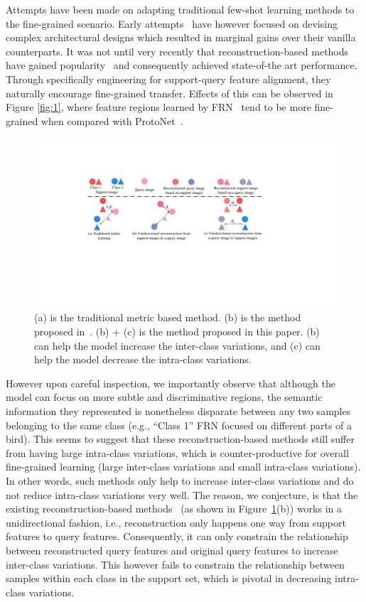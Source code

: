 \documentclass[letterpaper]{article} %
\begin{document}
Attempts have been made on adapting traditional few-shot learning methods to the fine-grained scenario. Early attempts~\cite{Huang2021LowRankPA, sun2020few, zhu2020multi} have however focused on devising complex architectural designs which resulted in marginal gains over their vanilla counterparts. It was not until very recently that reconstruction-based methods have gained popularity~\cite{Wertheimer_2021_CVPR, NEURIPS2020_fa28c6cd} and consequently achieved state-of-the art performance. Through specifically engineering for {support-query} feature alignment, they naturally encourage fine-grained transfer. Effects of this can be observed in Figure \ref{fig:1}, where feature regions learned by FRN~\cite{Wertheimer_2021_CVPR} tend to be more fine-grained when compared with ProtoNet~\cite{NIPS2017_cb8da676}. 


\begin{figure}[ht]
  \centering
  \includegraphics[width=0.8\linewidth]{figures/1.2.pdf}
  \caption{(a) is the traditional metric based method. (b) is the method proposed in~\cite{Wertheimer_2021_CVPR}. (b) + (c) is the method proposed in this paper. (b) can help the model increase the inter-class variations, and (c) can help the model decrease the intra-class variations.}
  \label{fig:1.2}
\end{figure}


However upon careful inspection, we importantly observe that although the model can focus on more subtle and discriminative regions, the semantic information they represented is nonetheless disparate between any two samples belonging to the same class (e.g., ``Class 1'' FRN focused on different parts of a bird). This seems to suggest that these reconstruction-based methods still suffer from having large intra-class variations, which is counter-productive for overall fine-grained learning (large inter-class variations and small intra-class variations). In other words, such methods only help to increase inter-class variations and do not reduce intra-class variations very well. The reason, we conjecture, is that the existing reconstruction-based methods~\cite{Wertheimer_2021_CVPR, NEURIPS2020_fa28c6cd} (as shown in Figure~\ref{fig:1.2}(b)) works in a unidirectional fashion, i.e., reconstruction only happens one way from support features to query features. 
Consequently, it can only constrain the relationship between reconstructed query features and original query features to increase inter-class variations. This however fails to constrain the relationship between samples within each class in the support set, which is pivotal in decreasing intra-class variations.
\end{document}
